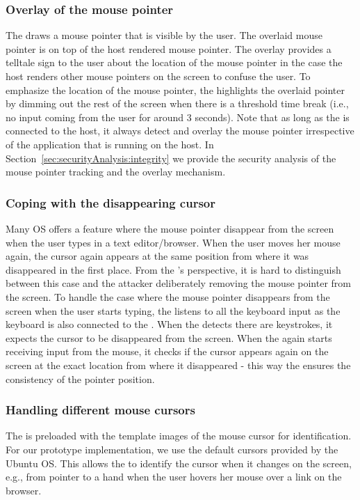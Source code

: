 \subsubsection{\bfseries Overlay of the mouse pointer} The \device draws a mouse pointer that is visible by the user. The overlaid mouse pointer is on top of the host rendered mouse pointer. The overlay provides a telltale sign to the user about the location of the mouse pointer in the case the host renders other mouse pointers on the screen to confuse the user. To emphasize the location of the mouse pointer, the \device highlights the overlaid pointer by dimming out the rest of the screen when there is a threshold time break (i.e., no input coming from the user for around 3 seconds). Note that as long as the \device is connected to the host, it always detect and overlay the mouse pointer irrespective of the application that is running on the host. In Section~\ref{sec:securityAnalysis:integrity} we provide the security analysis of the mouse pointer tracking and the overlay mechanism.


\subsubsection{\bfseries Coping with the disappearing cursor} Many OS offers a feature where the mouse pointer disappear from the screen when the user types in a text editor/browser. When the user moves her mouse again, the cursor again appears at the same position from where it was disappeared in the first place. From the \device's perspective, it is hard to distinguish between this case and the attacker deliberately removing the mouse pointer from the screen. To handle the case where the mouse pointer disappears from the screen when the user starts typing, the \device listens to all the keyboard input as the keyboard is also connected to the \device. When the \device detects there are keystrokes, it expects the cursor to be disappeared from the screen. When the \device again starts receiving input from the mouse, it checks if the cursor appears again on the screen at the exact location from where it disappeared - this way the \device ensures the consistency of the pointer position.  


\subsubsection{\bfseries Handling different mouse cursors} The \device is preloaded with the template images of the mouse cursor for identification. For our \name prototype implementation, we use the default cursors provided by the Ubuntu OS. This allows the \device to identify the cursor when it changes on the screen, e.g., from pointer to a hand when the user hovers her mouse over a link on the browser. 

